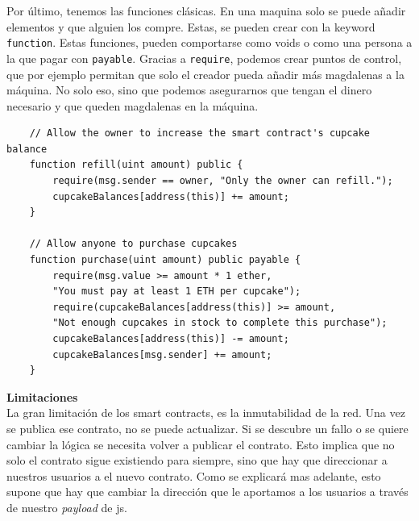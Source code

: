 Por último, tenemos las funciones clásicas. En una maquina solo se puede añadir elementos y que alguien los compre. Estas, se pueden crear con la keyword \verb|function|. Estas funciones, pueden comportarse como voids o como una persona a la que pagar con \verb|payable|.
Gracias a \verb|require|, podemos crear puntos de control, que por ejemplo permitan que solo el creador pueda añadir más magdalenas a la máquina. No solo eso, sino que podemos asegurarnos que tengan el dinero necesario y que queden magdalenas en la máquina.
\begin{lstlisting}
    // Allow the owner to increase the smart contract's cupcake balance
    function refill(uint amount) public {
        require(msg.sender == owner, "Only the owner can refill.");
        cupcakeBalances[address(this)] += amount;
    }

    // Allow anyone to purchase cupcakes
    function purchase(uint amount) public payable {
        require(msg.value >= amount * 1 ether, 
        "You must pay at least 1 ETH per cupcake");
        require(cupcakeBalances[address(this)] >= amount, 
        "Not enough cupcakes in stock to complete this purchase");
        cupcakeBalances[address(this)] -= amount;
        cupcakeBalances[msg.sender] += amount;
    }
\end{lstlisting}
\textbf{Limitaciones}\\
La gran limitación de los smart contracts, es la inmutabilidad de la red. Una vez se publica ese contrato, no se puede actualizar. Si se descubre un fallo o se quiere cambiar la lógica se necesita volver a publicar el contrato. Esto implica que no solo el contrato sigue existiendo para siempre, sino que hay que direccionar a nuestros usuarios a el nuevo contrato.
Como se explicará mas adelante, esto supone que hay que cambiar la dirección que le aportamos a los usuarios a través de nuestro \textit{payload} de js.
